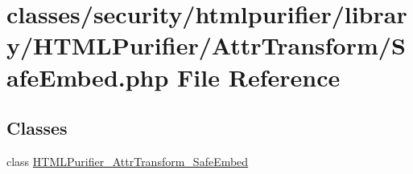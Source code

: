 \hypertarget{AttrTransform_2SafeEmbed_8php}{\section{classes/security/htmlpurifier/library/\+H\+T\+M\+L\+Purifier/\+Attr\+Transform/\+Safe\+Embed.php File Reference}
\label{AttrTransform_2SafeEmbed_8php}
}
\subsection*{Classes}
\begin{DoxyCompactItemize}
\item 
class \hyperlink{classHTMLPurifier__AttrTransform__SafeEmbed}{H\+T\+M\+L\+Purifier\+\_\+\+Attr\+Transform\+\_\+\+Safe\+Embed}
\end{DoxyCompactItemize}
